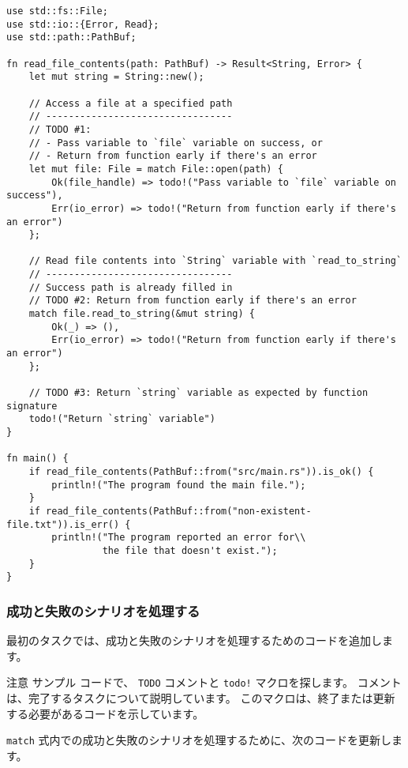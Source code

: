 \begin{lstlisting}[numbers=none]
use std::fs::File;
use std::io::{Error, Read};
use std::path::PathBuf;

fn read_file_contents(path: PathBuf) -> Result<String, Error> {
    let mut string = String::new();

    // Access a file at a specified path
    // ---------------------------------
    // TODO #1:
    // - Pass variable to `file` variable on success, or
    // - Return from function early if there's an error
    let mut file: File = match File::open(path) {
        Ok(file_handle) => todo!("Pass variable to `file` variable on success"),
        Err(io_error) => todo!("Return from function early if there's an error")
    };

    // Read file contents into `String` variable with `read_to_string`
    // ---------------------------------
    // Success path is already filled in
    // TODO #2: Return from function early if there's an error
    match file.read_to_string(&mut string) {
        Ok(_) => (),
        Err(io_error) => todo!("Return from function early if there's an error")
    };

    // TODO #3: Return `string` variable as expected by function signature
    todo!("Return `string` variable")
}

fn main() {
    if read_file_contents(PathBuf::from("src/main.rs")).is_ok() {
        println!("The program found the main file.");
    }
    if read_file_contents(PathBuf::from("non-existent-file.txt")).is_err() {
        println!("The program reported an error for\\
                 the file that doesn't exist.");
    }
}
\end{lstlisting}

\subsubsection{成功と失敗のシナリオを処理する}

最初のタスクでは、成功と失敗のシナリオを処理するためのコードを追加します。

\begin{itembox}[l]{注意}
サンプル コードで、 \texttt{TODO} コメントと \texttt{todo!} マクロを探します。 コメントは、完了するタスクについて説明しています。 このマクロは、終了または更新する必要があるコードを示しています。
\end{itembox}

\texttt{match} 式内での成功と失敗のシナリオを処理するために、次のコードを更新します。

